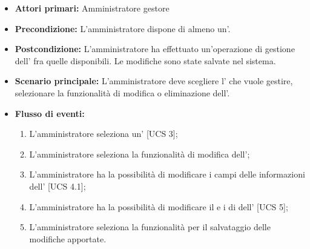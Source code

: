 \begin{itemize}
	\item \textbf{Attori primari:} Amministratore gestore
	\item \textbf{Precondizione:} L'amministratore dispone di almeno un'.
	\item \textbf{Postcondizione:} L'amministratore ha effettuato un'operazione di gestione dell' fra quelle disponibili. Le modifiche sono state salvate nel sistema.
	\item \textbf{Scenario principale:} L'amministratore deve scegliere l' che vuole gestire, selezionare la funzionalità di modifica o eliminazione dell'.
	\item \textbf{Flusso di eventi:}
	\begin{enumerate}
		\item L'amministratore seleziona un' [UCS 3];
		\item L'amministratore seleziona la funzionalità di modifica dell';
		\item L'amministratore ha la possibilità di modificare i campi delle informazioni dell' [UCS 4.1];
		\item L'amministratore ha la possibilità di modificare il  e i  di  dell' [UCS 5];
		\item L'amministratore seleziona la funzionalità per il salvataggio delle modifiche apportate.
	\end{enumerate}
\end{itemize}
\newpage
